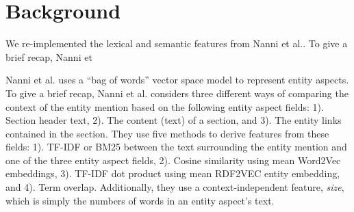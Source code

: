 \section{Background}
\label{sec:Background}

We re-implemented the lexical and semantic features from Nanni et
al.\cite{nanni2018entity}. To give a brief recap, Nanni et %

Nanni et al. \cite{nanni2018entity} uses a ``bag of words'' vector space model to represent entity aspects. To give a brief recap, Nanni et al.\cite{nanni2018entity} considers three different ways of comparing the context of the entity mention based on the following entity aspect fields: 1). Section header text, 2). The content (text) of a section, and 3). The entity links contained in the section. They use five methods to derive features from these fields: 1). TF-IDF or BM25 between the text surrounding the entity mention and one of the three entity aspect fields, 2). Cosine similarity using mean Word2Vec embeddings, 3). TF-IDF dot product using mean RDF2VEC entity embedding, and 4). Term overlap. Additionally, they use a context-independent feature, \textit{size}, which is simply the numbers of words in an entity aspect's text.

\label{entity-aspect-representation}








